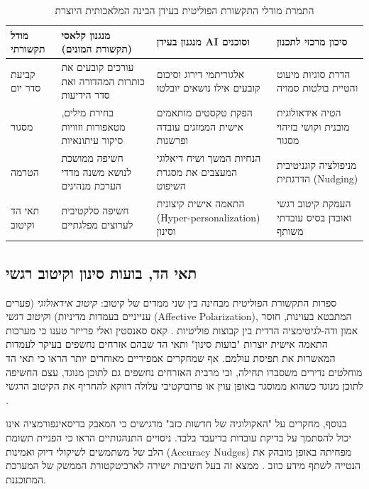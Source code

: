 \begin{table}[htbp]
\centering
\caption{התמרת מודלי התקשורת הפוליטית בעידן הבינה המלאכותית היוצרת}
\label{tab:polcomm-models}
\begin{tabular}{|p{3.0cm}|p{3.8cm}|p{4.2cm}|p{3.6cm}|}
\hline
\textbf{מודל תקשורתי} & \textbf{מנגנון קלאסי (תקשורת המונים)} & \textbf{מנגנון בעידן AI וסוכנים} & \textbf{סיכון מרכזי לתכנון} \\
\hline
קביעת סדר יום \cite{mccombs1972agenda} & עורכים קובעים את כותרות המהדורה ואת סדר הידיעות & אלגוריתמי דירוג וסיכום קובעים אילו נושאים יובלטו & הדרת סוגיות מיעוט והטיית בולטות סמויה \\
\hline
מסגור \cite{entman1993framing} & בחירת מילים, מטאפורות וזוויות סיקור עיתונאיות & הפקת טקסטים מותאמים אישית הממזגים עובדה ופרשנות & הטיה אידאולוגית מובנית וקושי בזיהוי מסגור \\
\hline
הטרמה \cite{scheufele2007framing} & חשיפה ממושכת לנושא משנה מדדי הערכת מנהיגים & הנחיות המשך ושיח דיאלוגי המעצבים את מסגרת השיפוט & מניפולציה קוגניטיבית הדרגתית (Nudging) \\
\hline
תאי הד וקיטוב \cite{sunstein2017republic, iyengar2019origins} & חשיפה סלקטיבית לערוצים מפלגתיים & התאמה אישית קיצונית (Hyper-personalization) וסינון & העמקת קיטוב רגשי ואובדן בסיס עובדתי משותף \\
\hline
\end{tabular}
\end{table}

\subsection{תאי הד, בועות סינון וקיטוב רגשי}
ספרות התקשורת הפוליטית מבחינה בין שני ממדים של קיטוב: \emph{קיטוב אידאולוגי} (פערים ענייניים בעמדות מדיניות) ו\emph{קיטוב רגשי} (Affective Polarization), המתבטא בעוינות, חוסר אמון ודה-לגיטימציה הדדית בין קבוצות פוליטיות \cite{iyengar2019origins}. קאס סאנסטין \cite{sunstein2017republic} ואלי פרייזר \cite{pariser2011filter} טענו כי מערכות התאמה אישית יוצרות "בועות סינון" ותאי הד שבהם אזרחים נחשפים בעיקר לעמדות המאשרות את תפיסת עולמם. אף שמחקרים אמפיריים מאוחרים יותר הראו כי תאי הד מוחלטים נדירים משסברו תחילה, וכי מרבית האזרחים נחשפים גם לתוכן מנוגד, עצם החשיפה לתוכן מנוגד כשהוא ממוסגר באופן עוין או פרובוקטיבי עלולה דווקא להחריף את הקיטוב הרגשי \cite{benkler2018network}.

בנוסף, מחקרים על "האקולוגיה של חדשות כזב" \cite{lazer2018science} מדגישים כי המאבק בדיסאינפורמציה אינו יכול להסתמך על בדיקת עובדות בדיעבד בלבד. ניסויים התנהגותיים הראו כי הפניית תשומת הלב של משתמשים לשיקולי דיוק ואמינות (Accuracy Nudges) מפחיתה באופן מובהק את הנטייה לשתף מידע כוזב \cite{pennycook2021shifting}. ממצא זה בעל חשיבות ישירה לארכיטקטורת הממשק של המערכת המתוכננת.

